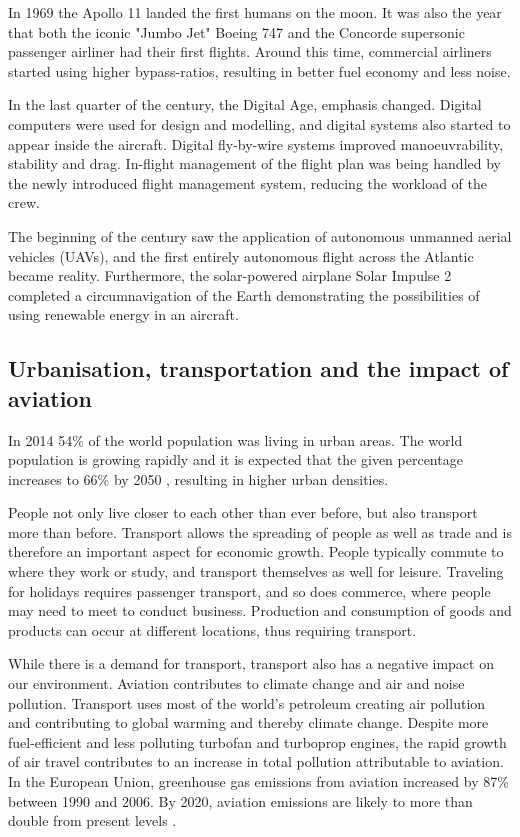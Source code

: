 In 1969 the Apollo 11 landed the first humans on the moon. It was also the year
that both the iconic "Jumbo Jet" Boeing 747 and the Concorde supersonic
passenger airliner had their first flights.
Around this time, commercial airliners started using higher bypass-ratios, resulting in
better fuel economy and less noise. %

In the last quarter of the  century, the Digital Age, emphasis changed.
Digital computers were used for design and modelling, and digital systems also
started to appear inside the aircraft. Digital fly-by-wire systems improved
manoeuvrability, stability and drag. In-flight management of the flight plan was
being handled by the newly introduced flight management system, reducing the
workload of the crew.

The beginning of the  century saw the application of autonomous unmanned
aerial vehicles (UAVs), and the first entirely autonomous flight across the
Atlantic became reality. Furthermore, the solar-powered airplane Solar Impulse 2
completed a circumnavigation of the Earth demonstrating the possibilities of
using renewable energy in an aircraft.

\subsection{Urbanisation, transportation and the impact of aviation}
In 2014 54\% of the world population was living in urban areas. %
The world population is growing rapidly and it is expected that the given
percentage increases to 66\% by 2050 \cite{UnitedNations2014}, resulting
in higher urban densities.

People not only live closer to each other than ever before, but also transport
more than before. Transport allows the spreading of people as well as trade and
is therefore an important aspect for economic growth. People typically commute
to where they work or study, and transport themselves as well for leisure.
Traveling for holidays requires passenger transport, and so does commerce, where
people may need to meet to conduct business. Production and consumption of goods
and products can occur at different locations, thus requiring transport.

While there is a demand for transport, transport also has a negative impact on
our environment. Aviation contributes to climate change and air and noise
pollution. Transport uses most of the world's petroleum creating air pollution
and contributing to global warming and thereby climate change. Despite more
fuel-efficient and less polluting turbofan and turboprop engines, the rapid
growth of air travel contributes to an increase in total pollution attributable
to aviation. In the European Union, greenhouse gas emissions from aviation
increased by 87\% between 1990 and 2006. By 2020, aviation emissions are likely
to more than double from present levels \cite{European2006}.

